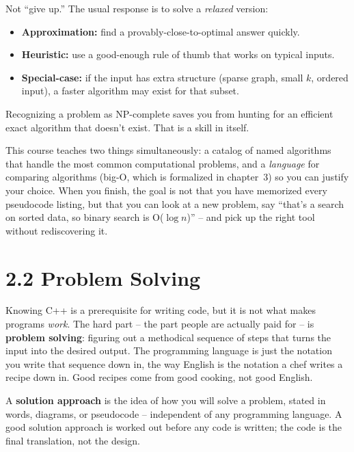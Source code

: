 \documentclass[11pt]{article}
\begin{document}
\begin{ideabox}
Not ``give up.'' The usual response is to solve a \emph{relaxed}
version:
\begin{itemize}[leftmargin=*,noitemsep]
    \item \textbf{Approximation:} find a provably-close-to-optimal
          answer quickly.
    \item \textbf{Heuristic:} use a good-enough rule of thumb that
          works on typical inputs.
    \item \textbf{Special-case:} if the input has extra structure
          (sparse graph, small $k$, ordered input), a faster algorithm
          may exist for that subset.
\end{itemize}
Recognizing a problem as NP-complete saves you from hunting for an
efficient exact algorithm that doesn't exist. That is a skill in
itself.
\end{ideabox}

\begin{ideabox}
This course teaches two things simultaneously: a catalog of named
algorithms that handle the most common computational problems, and a
\emph{language} for comparing algorithms (big-O, which is formalized
in chapter~3) so you can justify your choice. When you finish, the
goal is not that you have memorized every pseudocode listing, but
that you can look at a new problem, say ``that's a search on sorted
data, so binary search is O($\log n$)'' -- and pick up the right tool
without rediscovering it.
\end{ideabox}

\section{2.2 Problem Solving}

Knowing C++ is a prerequisite for writing code, but it is not what
makes programs \emph{work}. The hard part -- the part people are
actually paid for -- is \textbf{problem solving}: figuring out a
methodical sequence of steps that turns the input into the desired
output. The programming language is just the notation you write that
sequence down in, the way English is the notation a chef writes a
recipe down in. Good recipes come from good cooking, not good English.

\begin{defnbox}
A \textbf{solution approach} is the idea of how you will solve a
problem, stated in words, diagrams, or pseudocode -- independent of
any programming language. A good solution approach is worked out
before any code is written; the code is the final translation, not
the design.
\end{defnbox}
\end{document}
